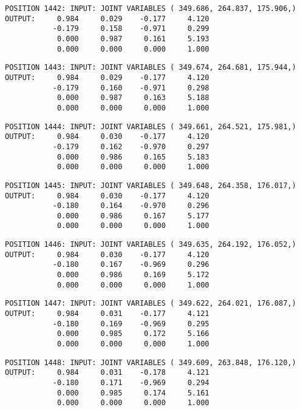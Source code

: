 \begin{verbatim}
POSITION 1442: INPUT: JOINT VARIABLES ( 349.686, 264.837, 175.906,)
OUTPUT:     0.984     0.029    -0.177     4.120
           -0.179     0.158    -0.971     0.299
            0.000     0.987     0.161     5.193
            0.000     0.000     0.000     1.000
\end{verbatim} \pagebreak[1]\begin{verbatim}
POSITION 1443: INPUT: JOINT VARIABLES ( 349.674, 264.681, 175.944,)
OUTPUT:     0.984     0.029    -0.177     4.120
           -0.179     0.160    -0.971     0.298
            0.000     0.987     0.163     5.188
            0.000     0.000     0.000     1.000
\end{verbatim} \pagebreak[1]\begin{verbatim}
POSITION 1444: INPUT: JOINT VARIABLES ( 349.661, 264.521, 175.981,)
OUTPUT:     0.984     0.030    -0.177     4.120
           -0.179     0.162    -0.970     0.297
            0.000     0.986     0.165     5.183
            0.000     0.000     0.000     1.000
\end{verbatim} \pagebreak[1]\begin{verbatim}
POSITION 1445: INPUT: JOINT VARIABLES ( 349.648, 264.358, 176.017,)
OUTPUT:     0.984     0.030    -0.177     4.120
           -0.180     0.164    -0.970     0.296
            0.000     0.986     0.167     5.177
            0.000     0.000     0.000     1.000
\end{verbatim} \pagebreak[1]\begin{verbatim}
POSITION 1446: INPUT: JOINT VARIABLES ( 349.635, 264.192, 176.052,)
OUTPUT:     0.984     0.030    -0.177     4.120
           -0.180     0.167    -0.969     0.296
            0.000     0.986     0.169     5.172
            0.000     0.000     0.000     1.000
\end{verbatim} \pagebreak[1]\begin{verbatim}
POSITION 1447: INPUT: JOINT VARIABLES ( 349.622, 264.021, 176.087,)
OUTPUT:     0.984     0.031    -0.177     4.121
           -0.180     0.169    -0.969     0.295
            0.000     0.985     0.172     5.166
            0.000     0.000     0.000     1.000
\end{verbatim} \pagebreak[1]\begin{verbatim}
POSITION 1448: INPUT: JOINT VARIABLES ( 349.609, 263.848, 176.120,)
OUTPUT:     0.984     0.031    -0.178     4.121
           -0.180     0.171    -0.969     0.294
            0.000     0.985     0.174     5.161
            0.000     0.000     0.000     1.000
\end{verbatim} \pagebreak[1]\begin{verbatim}

\end{verbatim}
